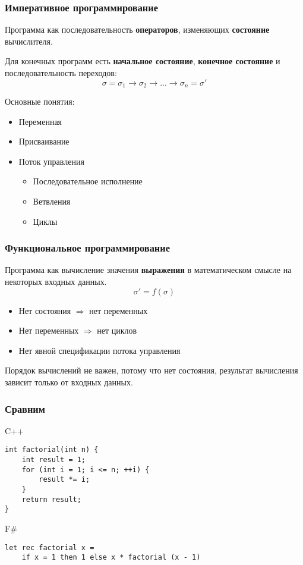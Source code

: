 \documentclass[xetex,mathserif,serif]{beamer}
\begin{document}
	\begin{frame}
		\frametitle{Императивное программирование}
		Программа как последовательность \textbf{операторов}, изменяющих \textbf{состояние} вычислителя.

		Для конечных программ есть \textbf{начальное состояние}, \textbf{конечное состояние} и последовательность переходов:
		$$\sigma = \sigma_1 \rightarrow \sigma_2 \rightarrow ... \rightarrow \sigma_n = \sigma'$$
		
		Основные понятия:
		\begin{itemize}
			\item Переменная
			\item Присваивание
			\item Поток управления
			\begin{itemize}
				\item Последовательное исполнение
				\item Ветвления
				\item Циклы
			\end{itemize}
		\end{itemize}
	\end{frame}
	
	\begin{frame}
		\frametitle{Функциональное программирование}
		Программа как вычисление значения \textbf{выражения} в математическом смысле на некоторых входных данных.
		$$\sigma' = f(\sigma)$$
	
		\begin{itemize}
			\item Нет состояния $\Rightarrow$ нет переменных
			\item Нет переменных $\Rightarrow$ нет циклов
			\item Нет явной спецификации потока управления
		\end{itemize}
		Порядок вычислений не важен, потому что нет состояния, результат вычисления зависит только от входных данных.
	\end{frame}
	
	\begin{frame}[fragile]
		\frametitle{Сравним}
		\begin{alertblock}{C++}
			\begin{verbatim}
int factorial(int n) {
    int result = 1;
    for (int i = 1; i <= n; ++i) {
        result *= i;
    }
    return result;
}
			\end{verbatim}
		\end{alertblock}
		\begin{exampleblock}{F\#}
			\begin{verbatim}
let rec factorial x =
    if x = 1 then 1 else x * factorial (x - 1)
            \end{verbatim}
		\end{exampleblock}
\end{frame}
\end{document}
